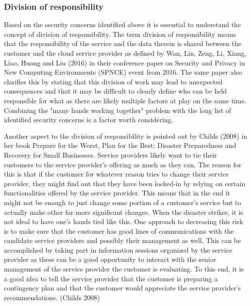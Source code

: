 \documentclass{article}
\begin{document}
\subsubsection{Division of responsibility}
Based on the security concerns identified above it is essential to understand the concept of division of responsibility.
The term division of responsibility means that the responsibility of the service and the data therein is shared between the customer and the cloud service provider as defined by Wan, Lin, Zeng, Li, Xiang, Liao, Huang and Liu (2016) in their conference paper on Security and Privacy in New Computing Environments (SPNCE) event from 2016.
The same paper also clarifies this by stating that this division of work may lead to unexpected consequences and that it may be difficult to clearly define who can be held responsible for what as there are likely multiple factors at play on the same time.
Combining the "many hands working together" problem with the long list of identified security concerns is a factor worth considering.
\par
Another aspect to the division of responsibility is pointed out by Childs (2008) in her book Prepare for the Worst, Plan for the Best: Disaster Preparedness and Recovery for Small Businesses. 
Service providers likely want to tie their customers to the service provider's offering as much as they can. The reason for this is that if the customer for whatever reason tries to change their service provider, they might find out that they have been locked-in by relying on certain functionalities offered by the service provider. This means that in the end it might not be enough to just change some portion of a customer's service but to actually make other far more significant changes. When the disaster strikes, it is not ideal to have one's hands tied like this. One approach to decreasing this risk is to make sure that the customer has good lines of communications with the candidate service providers and possibly their management as well. This can be accomplished by taking part in information sessions organized by the service provider as these can be a good opportunity to interact with the senior management of the service provider the customer is evaluating. To this end, it is a good idea to tell the service provider that the customer is preparing a contingency plan and that the customer would appreciate the service provider's recommendations. (Childs 2008) 
\par
\end{document}
